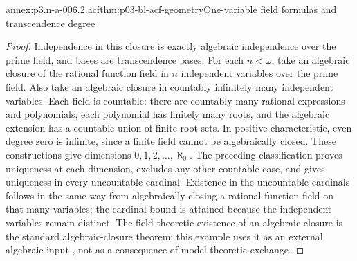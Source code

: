 \begin{annexitem}{annex:p3.n-a-006.2.acf}{thm:p03-bl-acf-geometry}{One-variable field formulas and transcendence degree}
\begin{proof}
Independence in this closure is exactly algebraic independence over
the prime field, and bases are transcendence bases. For each
\(n<\omega\), take an algebraic closure of the rational function
field in \(n\) independent variables over the prime field. Also
take an algebraic closure in countably infinitely many independent
variables. Each field is countable: there are countably many
rational expressions and polynomials, each polynomial has finitely
many roots, and the algebraic extension has a countable union of
finite root sets. In positive characteristic, even degree zero is
infinite, since a finite field cannot be algebraically closed.
These constructions give dimensions \(0,1,2,\ldots,\aleph_0\).
The preceding classification proves uniqueness at each dimension,
excludes any other countable case, and gives uniqueness in every
uncountable cardinal. Existence in the uncountable cardinals follows
in the same way from algebraically closing a rational function field
on that many variables; the cardinal bound is attained because
the independent variables remain distinct.
The field-theoretic existence of an algebraic closure is the
standard algebraic-closure theorem; this example uses it as an
external algebraic input \cite{Steinitz1910}, not as a consequence
of model-theoretic exchange.
\end{proof}
\end{annexitem}
